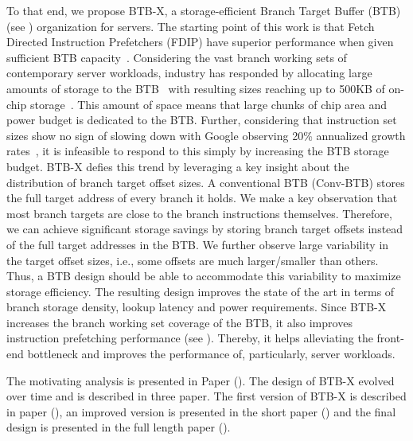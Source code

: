 \documentclass[../main.tex]{subfiles}
\begin{document}
\begin{refsection}
To that end, we propose BTB-X, a storage-efficient Branch Target
Buffer (BTB) (see ) organization for servers.
The starting point of this work is that Fetch Directed Instruction
Prefetchers (FDIP) have superior performance when given sufficient BTB
capacity~\cite{ishii21_re_fetch_direc_instr_prefet}. Considering the
vast branch working sets of contemporary server workloads, industry
has responded by allocating large amounts of storage to the
BTB~\cite{neoverse,IBMz,zen2} with resulting sizes reaching up to
500KB of on-chip storage~\cite{exynos}. This amount of space means
that large chunks of chip area and power budget is dedicated to the
BTB. Further, considering that instruction set sizes show no sign of
slowing down with Google observing 20\% annualized growth
rates~\cite{kanev15_profil}, it is infeasible to respond to this
simply by increasing the BTB storage budget. BTB-X defies this trend
by leveraging a key insight about the distribution of branch target
offset sizes. A conventional BTB (Conv-BTB) stores the full target
address of every branch it holds. We make a key observation that most
branch targets are close to the branch instructions
themselves. Therefore, we can achieve significant storage savings by
storing branch target offsets instead of the full target addresses in
the BTB. We further observe large variability in the target offset
sizes, i.e., some offsets are much larger/smaller than others. Thus, a
BTB design should be able to accommodate this variability to maximize
storage efficiency. The resulting design improves the state of the art
in terms of branch storage density, lookup latency and power
requirements. Since BTB-X increases the branch working set coverage of
the BTB, it also improves instruction prefetching performance (see
). Thereby, it helps alleviating the
front-end bottleneck and improves the performance of, particularly,
server workloads.

The motivating analysis is presented in Paper  ().
The design of BTB-X evolved over time and is described in three paper. The first version of BTB-X is described in paper 
(), an improved version is presented in the
short paper  () and the final design is
presented in the full length paper  ().


\end{refsection}
\end{document}
